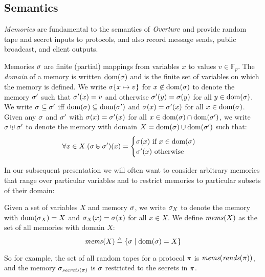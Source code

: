 \subsection{Semantics}
\label{section-lang-semantics}

\minicatredxfig

\emph{Memories} are fundamental to the semantics of $\mathit{Overture}$ and
provide random tape and secret inputs to protocols, and also record
message sends, public broadcast, and client outputs.
\begin{definition}
Memories $\sigma$ are finite (partial) mappings from variables $x$ to
values $v \in \mathbb{F}_p$.  The \emph{domain} of a memory is written
$\mathrm{dom}(\sigma)$ and is the finite set of variables on which the memory
is defined.  We write $\sigma\{ x \mapsto v\}$ for
$x\not\in\mathrm{dom}(\sigma)$ to denote the memory $\sigma'$ such that
$\sigma'(x) = v$ and otherwise $\sigma'(y) = \sigma(y)$ for all $y \in
\mathrm{dom}(\sigma)$. We write $\sigma \subseteq \sigma'$ iff $\mathrm{dom}(\sigma)
\subseteq \mathrm{dom}(\sigma')$ and $\sigma(x) = \sigma'(x)$ for all $x \in
\mathrm{dom}(\sigma)$. Given any $\sigma$ and $\sigma'$ with $\sigma(x) =
\sigma'(x)$ for all $x \in \mathrm{dom}(\sigma) \cap \mathrm{dom}(\sigma')$, we write
$\sigma \uplus \sigma'$ to denote the memory with domain $X =
\mathrm{dom}(\sigma) \cup \mathrm{dom}(\sigma')$ such that:
$$
\forall x \in X .
(\sigma \uplus \sigma')(x) =
\begin{cases} \sigma(x) \text{\ if\ } x\in\mathrm{dom}(\sigma) \\ \sigma'(x) \text{\ otherwise\ }\end{cases} 
$$
\end{definition}
In our subsequent presentation we will often want to consider arbitrary
memories that range over particular variables and to restrict
memories to particular subsets of their domain:
\begin{definition}
  Given a set of variables $X$ and memory $\sigma$, we write
  $\sigma_X$ to denote the memory with $\mathrm{dom}(\sigma_X) = X$ and
  $\sigma_X(x) = \sigma(x)$ for all $x \in X$. We define $\mathit{mems}(X)$ as
  the set of all memories with domain $X$:
  $$
  \mathit{mems}(X) \triangleq \{ \sigma \mid \mathrm{dom}(\sigma) = X \}
  $$
\end{definition}
So for example, the set of all random tapes for
a protocol $\pi$ is $\mathit{mems}(\mathit{rands}(\pi))$, and the memory $\sigma_{\mathit{secrets}(\pi)}$
is $\sigma$ restricted to the secrets in $\pi$.

